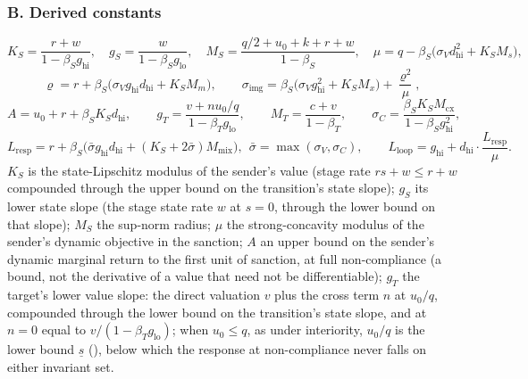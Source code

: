\subsubsection*{B. Derived constants}
\[
K_S=\frac{r+w}{1-\beta_Sg_{\mathrm{hi}}},\quad
g_S=\frac{w}{1-\beta_Sg_{\mathrm{lo}}},\quad
M_S=\frac{q/2+u_0+k+r+w}{1-\beta_S},\quad
\mu=q-\beta_S\bigl(\sigma_Vd_{\mathrm{hi}}^2+K_SM_s\bigr),
\]
\[
\varrho=r+\beta_S\bigl(\sigma_Vg_{\mathrm{hi}}d_{\mathrm{hi}}+K_SM_m\bigr),\qquad
\sigma_{\mathrm{img}}=\beta_S\bigl(\sigma_Vg_{\mathrm{hi}}^2+K_SM_x\bigr)+\frac{\varrho^2}{\mu},
\]
\[
A=u_0+r+\beta_SK_Sd_{\mathrm{hi}},\qquad
g_T=\frac{v+nu_0/q}{1-\beta_Tg_{\mathrm{lo}}},\qquad
M_T=\frac{c+v}{1-\beta_T},\qquad
\sigma_C=\frac{\beta_SK_SM_{\mathrm{cx}}}{1-\beta_Sg_{\mathrm{hi}}^2},
\]
\[
L_{\mathrm{resp}}=r+\beta_S\bigl(\bar\sigma g_{\mathrm{hi}}d_{\mathrm{hi}}
+(K_S+2\bar\sigma)M_{\mathrm{mix}}\bigr),\ \ \bar\sigma=\max(\sigma_V,\sigma_C),
\qquad
L_{\mathrm{loop}}=g_{\mathrm{hi}}+d_{\mathrm{hi}}\cdot\frac{L_{\mathrm{resp}}}{\mu}.
\]
$K_S$ is the state-Lipschitz modulus of the sender's value (stage rate
$r s+w\le r+w$ compounded through the upper bound on the transition's state
slope); $g_S$ its lower state slope (the stage state rate $w$ at $s=0$, through
the lower bound on that slope); $M_S$ the
sup-norm radius; $\mu$ the strong-concavity modulus of the sender's dynamic
objective in the sanction; $A$ an upper bound on the sender's dynamic marginal
return to the first unit of sanction, at full non-compliance (a bound, not
the derivative of a value that need not be differentiable); $g_T$ the
target's lower value slope: the direct valuation $v$ plus the cross term
$n$ at $u_0/q$, compounded through the lower bound on the transition's state
slope, and at $n=0$ equal
to $v/(1-\beta_Tg_{\mathrm{lo}})$; when $u_0\le q$, as under interiority,
$u_0/q$ is the lower bound $\underline s$ (), below
which the response at non-compliance never falls on either invariant set.

